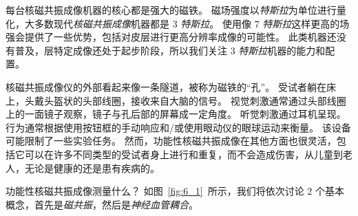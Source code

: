 每台核磁共振成像机器的核心都是强大的磁铁。
磁场强度以\textit{特斯拉}为单位进行量化，大多数现代\textit{核磁共振成像}机器都是 3 \textit{特斯拉}。
使用像 7 \textit{特斯拉}这样更高的场强会提供了一些优势，包括对皮层进行更高分辨率成像的可能性。
此类机器还没有普及，层特定成像还处于起步阶段，所以我们关注 3 \textit{特斯拉}机器的能力和配置。


核磁共振成像仪的外部看起来像一条隧道，被称为磁铁的“孔”。
受试者躺在床上，头戴头盔状的头部线圈，接收来自大脑的信号。
视觉刺激通常通过头部线圈上的一面镜子观察，镜子与孔后部的屏幕成一定角度。
听觉刺激通过耳机呈现。
行为通常根据使用按钮框的手动响应和/或使用眼动仪的眼球运动来衡量。
该设备可能限制了一些实验任务。
然而，功能性核磁共振成像在其他方面也很灵活，包括它可以在许多不同类型的受试者身上进行和重复，而不会造成伤害，从儿童到老人，无论是健康的还是患有疾病的。


功能性核磁共振成像测量什么？
如图~\ref{fig:6_1}~所示，我们将依次讨论 2 个基本概念，首先是\textit{磁共振}，然后是\textit{神经血管耦合}。


